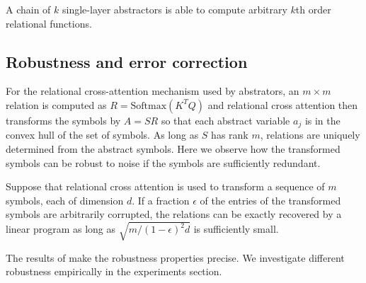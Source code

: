 \begin{result}
A chain of \(k\) single-layer  abstractors is able to compute arbitrary \(k\)th order relational functions.
\end{result}

\subsection{Robustness and error correction}

For the relational cross-attention mechanism used by abstrators, an \(m\times m\) relation
is computed as  \(R = \mbox{Softmax}(K^T Q)\)
and relational cross attention then transforms the symbols by
\(A = SR\) so that each abstract variable \(a_j\) is in the convex hull of the set of symbols.
As long as \(S\) has rank \(m\), relations are uniquely determined from the abstract symbols.
Here we observe how the transformed symbols can be robust to noise if the symbols are
sufficiently redundant. 

\begin{result}
Suppose that relational cross attention is used to transform a sequence of $m$ symbols, each of dimension $d$.
If a fraction $\epsilon$ of the entries of the transformed symbols are arbitrarily corrupted, 
the relations can be exactly recovered by a linear program as long as $\sqrt{m/(1-\epsilon)^2d}$ is sufficiently small.
\end{result}

The results of \cite{model_repair} make the robustness properties precise. We investigate different robustness  empirically in the experiments section.




